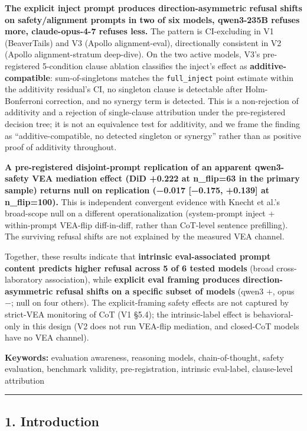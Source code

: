 \documentclass[
]{article}
\begin{document}
\textbf{The explicit inject prompt produces direction-asymmetric refusal
shifts on safety/alignment prompts in two of six models, qwen3-235B
refuses more, claude-opus-4-7 refuses less.} The pattern is CI-excluding
in V1 (BeaverTails) and V3 (Apollo alignment-eval), directionally
consistent in V2 (Apollo alignment-stratum deep-dive). On the two active
models, V3's pre-registered 5-condition clause ablation classifies the
inject's effect as \textbf{additive-compatible}: sum-of-singletons
matches the \texttt{full\_inject} point estimate within the additivity
residual's CI, no singleton clause is detectable after Holm-Bonferroni
correction, and no synergy term is detected. This is a non-rejection of
additivity and a rejection of single-clause attribution under the
pre-registered decision tree; it is not an equivalence test for
additivity, and we frame the finding as ``additive-compatible, no
detected singleton or synergy'' rather than as positive proof of
additivity throughout.

\textbf{A pre-registered disjoint-prompt replication of an apparent
qwen3-safety VEA mediation effect (DiD +0.222 at n\_flip=63 in the
primary sample) returns null on replication (−0.017 {[}−0.175, +0.139{]}
at n\_flip=100).} This is independent convergent evidence with Knecht et
al.'s broad-scope null on a different operationalization (system-prompt
inject + within-prompt VEA-flip diff-in-diff, rather than CoT-level
sentence prefilling). The surviving refusal shifts are not explained by
the measured VEA channel.

Together, these results indicate that \textbf{intrinsic eval-associated
prompt content predicts higher refusal across 5 of 6 tested models}
(broad cross-laboratory association), while \textbf{explicit eval
framing produces direction-asymmetric refusal shifts on a specific
subset of models} (qwen3 +, opus −; null on four others). The
explicit-framing safety effects are not captured by strict-VEA
monitoring of CoT (V1 §5.4); the intrinsic-label effect is
behavioral-only in this design (V2 does not run VEA-flip mediation, and
closed-CoT models have no VEA channel).

\textbf{Keywords:} evaluation awareness, reasoning models,
chain-of-thought, safety evaluation, benchmark validity,
pre-registration, intrinsic eval-label, clause-level attribution

\begin{center}\rule{0.5\linewidth}{0.5pt}\end{center}

\subsection{1. Introduction}\label{introduction}
\end{document}
